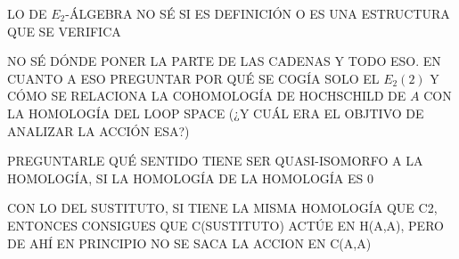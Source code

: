 \documentclass[TFM.tex]{subfiles}
\begin{document}
LO DE $E_2$-ÁLGEBRA NO SÉ SI ES DEFINICIÓN O ES UNA ESTRUCTURA QUE SE VERIFICA

NO SÉ DÓNDE PONER LA PARTE DE LAS CADENAS Y TODO ESO. EN CUANTO A ESO PREGUNTAR POR QUÉ SE COGÍA SOLO EL $E_2(2)$ Y CÓMO SE RELACIONA LA COHOMOLOGÍA DE HOCHSCHILD DE $A$ CON LA HOMOLOGÍA DEL LOOP SPACE (¿Y CUÁL ERA EL OBJTIVO DE ANALIZAR LA ACCIÓN ESA?)

PREGUNTARLE QUÉ SENTIDO TIENE SER QUASI-ISOMORFO A LA HOMOLOGÍA, SI LA HOMOLOGÍA DE LA HOMOLOGÍA ES 0

CON LO DEL SUSTITUTO, SI TIENE LA MISMA HOMOLOGÍA QUE C2, ENTONCES CONSIGUES QUE C(SUSTITUTO) ACTÚE EN H(A,A), PERO DE AHÍ EN PRINCIPIO NO SE SACA LA ACCION EN C(A,A)
\end{document}
